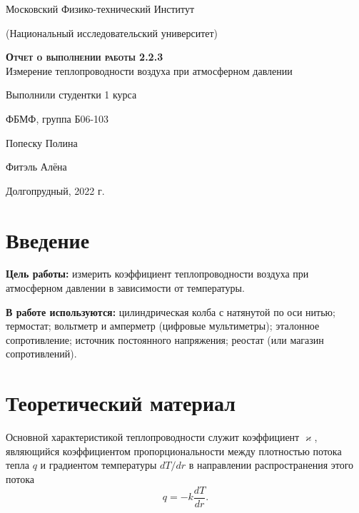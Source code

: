 \documentclass[12pt,a4paper]{article}
\begin{document}
\begin{titlepage}
  \begin{center}
    \huge
    Московский Физико-технический Институт
    
    (Национальный исследовательский университет)
    \vspace{0.5cm}

   
    \vspace{0.25cm}
 
    \vfill
 
    \vfill

    \textsc{\bf{Отчет о выполнении работы 2.2.3}}\\[3mm]
    
    {\LARGE  Измерение теплопроводности воздуха при атмосферном давлении}
  \bigskip
    \vfill
    
\end{center}
\vfill
\begin{flushright}

    Выполнили студентки 1 курса
    
    ФБМФ, группа Б06-103

    Попеску Полина
    
    
    Фитэль Алёна

\end{flushright}
\bigskip


\vfill

\begin{center}
  Долгопрудный, 2022 г.
\end{center}
\end{titlepage}

\section{Введение}

\textbf{Цель работы:} измерить коэффициент теплопроводности воздуха при атмосферном
давлении в зависимости от температуры.


\textbf{В работе используются:} цилиндрическая колба с натянутой по оси нитью; термостат;
вольтметр и амперметр (цифровые мультиметры); эталонное сопротивление; источник
постоянного напряжения; реостат (или магазин сопротивлений).

\section{Теоретический материал}
Основной характеристикой теплопроводности служит коэффициент $\varkappa$, являющийся коэффициентом пропорциональности между плотностью потока тепла $q$ и градиентом температуры $dT/dr$ в направлении распространения этого потока
\begin{equation}
	q = -k \frac{dT}{dr}.
\end{equation}
\end{document}
